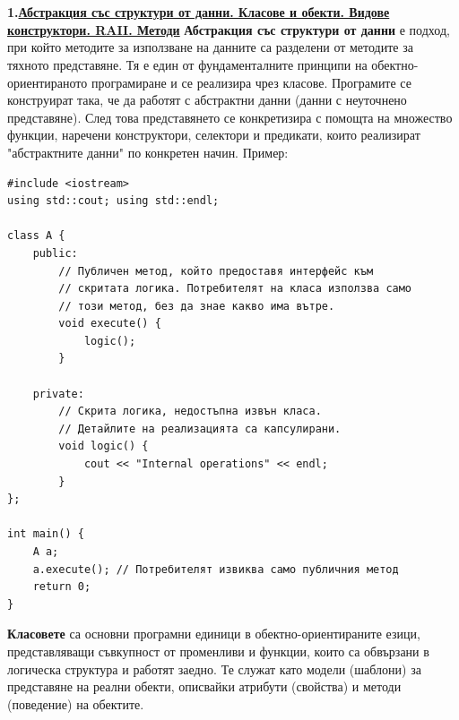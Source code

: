 \documentclass{article}
\begin{document}
\section*{\centering \color{bordeaux}{Обектно-ориентирано програмиране}}

\subsection*{\color{bordeaux}{16. ООП. Основни принципи. Класове и обекти. Наследяване и капсулация.}}

\textbf{1.\underline{Абстракция със структури от данни. Класове и обекти. Видове} \\
\underline{конструктори. RAII. Методи}} \newline\newline
\textbf{Абстракция със структури от данни} е подход, при който методите за използване на данните са разделени от методите за тяхното представяне.
Тя е един от фундаменталните принципи на обектно-ориентираното програмиране и се реализира чрез класове. Програмите се конструират така,
че да работят с абстрактни данни (данни с неуточнено представяне). След това представянето се конкретизира с помощта на множество функции,
наречени конструктори, селектори и предикати, които реализират "абстрактните данни" по конкретен начин. \newline\newline
Пример: \begin{lstlisting}[style=cpp]
#include <iostream>
using std::cout; using std::endl;

class A {
    public:
        // Публичен метод, който предоставя интерфейс към
        // скритата логика. Потребителят на класа използва само
        // този метод, без да знае какво има вътре.
        void execute() {
            logic();
        }

    private:
        // Скрита логика, недостъпна извън класа.
        // Детайлите на реализацията са капсулирани.
        void logic() {
            cout << "Internal operations" << endl;
        }
};

int main() {
    A a;
    a.execute(); // Потребителят извиква само публичния метод
    return 0;
}
\end{lstlisting}
\textbf{Класовете} са основни програмни единици в обектно-ориентираните езици, представляващи съвкупност от променливи и функции,
които са обвързани в логическа структура и работят заедно. Те служат като модели (шаблони) за представяне на реални обекти, описвайки
атрибути (свойства) и методи (поведение) на обектите. \newline
\end{document}
